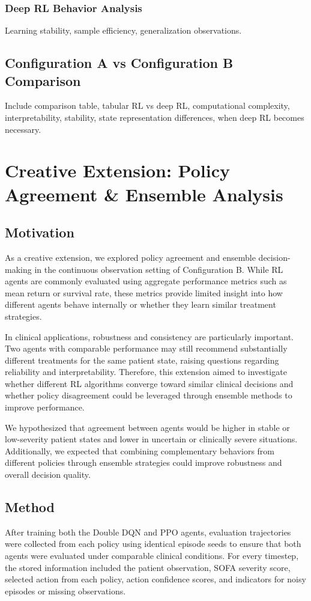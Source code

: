 \documentclass[11pt,a4paper]{article}
\begin{document}
\subsubsection{Deep RL Behavior Analysis}
Learning stability, sample efficiency, generalization observations.

\subsection{Configuration A vs Configuration B Comparison}
Include comparison table, tabular RL vs deep RL, computational complexity, interpretability, stability, state representation differences,
when deep RL becomes necessary.

\section{Creative Extension: Policy Agreement \& Ensemble Analysis}
\subsection{Motivation}
As a creative extension, we explored policy agreement and ensemble decision-making in the continuous observation setting of Configuration B. 
While RL agents are commonly evaluated using aggregate performance metrics such as mean return or survival rate, 
these metrics provide limited insight into how different agents behave internally or whether they learn similar treatment strategies.

In clinical applications, robustness and consistency are particularly important. 
Two agents with comparable performance may still recommend substantially different treatments for the same patient state, 
raising questions regarding reliability and interpretability. 
Therefore, this extension aimed to investigate whether different RL algorithms converge toward similar clinical decisions 
and whether policy disagreement could be leveraged through ensemble methods to improve performance.

We hypothesized that agreement between agents would be higher in stable or low-severity patient states and lower in uncertain or clinically severe situations.
Additionally, we expected that combining complementary behaviors from different policies through ensemble strategies could improve robustness
and overall decision quality.

\subsection{Method}
After training both the Double DQN and PPO agents, 
evaluation trajectories were collected from each policy using identical episode seeds 
to ensure that both agents were evaluated under comparable clinical conditions. 
For every timestep, the stored information included the patient observation, 
SOFA severity score, selected action from each policy, action confidence scores, 
and indicators for noisy episodes or missing observations.
\end{document}

